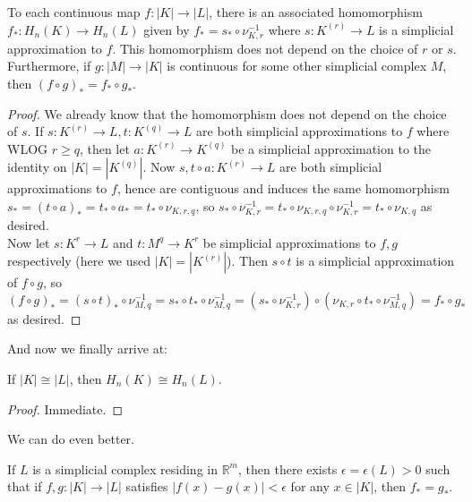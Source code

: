 \begin{proposition}
    To each continuous map $f:|K|\to|L|$, there is an associated homomorphism $f_\ast:H_n(K)\to H_n(L)$ given by $f_\ast=s_\ast\circ\nu_{K,r}^{-1}$ where $s:K^{(r)}\to L$ is a simplicial approximation to $f$.
    This homomorphism does not depend on the choice of $r$ or $s$.
    Furthermore, if $g:|M|\to |K|$ is continuous for some other simplicial complex $M$, then $(f\circ g)_\ast=f_\ast\circ g_\ast$.
\end{proposition}
\begin{proof}
    We already know that the homomorphism does not depend on the choice of $s$.
    If $s:K^{(r)}\to L,t:K^{(q)}\to L$ are both simplicial approximations to $f$ where WLOG $r\ge q$, then let $a:K^{(r)}\to K^{(q)}$ be a simplicial approximation to the identity on $|K|=|K^{(q)}|$.
    Now $s,t\circ a:K^{(r)}\to L$ are both simplicial approximations to $f$, hence are contiguous and induces the same homomorphism $s_\ast=(t\circ a)_\ast=t_\ast\circ a_\ast=t_\ast\circ\nu_{K,r,q}$, so $s_\ast\circ\nu_{K,r}^{-1}=t_\ast\circ\nu_{K,r,q}\circ\nu_{K,r}^{-1}=t_\ast\circ\nu_{K,q}$ as desired.\\
    Now let $s:K^{r}\to L$ and $t:M^{q}\to K^{r}$ be simplicial approximations to $f,g$ respectively (here we used $|K|=|K^{(r)}|$).
    Then $s\circ t$ is a simplicial approximation of $f\circ g$, so
    $$(f\circ g)_\ast=(s\circ t)_\ast\circ\nu_{M,q}^{-1}=s_\ast\circ t_\ast\circ \nu_{M,q}^{-1}=(s_\ast\circ\nu_{K,r}^{-1})\circ(\nu_{K,r}\circ t_\ast\circ\nu_{M,q}^{-1})=f_\ast\circ g_\ast$$
    as desired.
\end{proof}
And now we finally arrive at:
\begin{corollary}
    If $|K|\cong|L|$, then $H_n(K)\cong H_n(L)$.
\end{corollary}
\begin{proof}
    Immediate.
\end{proof}
We can do even better.
\begin{lemma}
    If $L$ is a simplicial complex residing in $\mathbb R^m$, then there exists $\epsilon=\epsilon(L)>0$ such that if $f,g:|K|\to|L|$ satisfies $|f(x)-g(x)|<\epsilon$ for any $x\in |K|$, then $f_\ast=g_\ast$.
\end{lemma}
